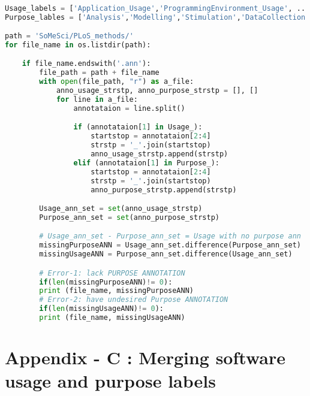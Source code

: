 \begin{lstlisting}[language=python,frame=tb,caption={Finding file names that have errors with software usage purpose labels in PLoS files},label=lst:useless]

Usage_labels = ['Application_Usage','ProgrammingEnvironment_Usage', ...] 
Purpose_lables = ['Analysis','Modelling','Stimulation','DataCollection', ...]

path = 'SoMeSci/PLoS_methods/'
for file_name in os.listdir(path):

	if file_name.endswith('.ann'):
		file_path = path + file_name
		with open(file_path, "r") as a_file:
			anno_usage_strstp, anno_purpose_strstp = [], []
			for line in a_file:
				annotataion = line.split()

				if (annotataion[1] in Usage_):
					startstop = annotataion[2:4]
					strstp = '_'.join(startstop)
					anno_usage_strstp.append(strstp)		
				elif (annotataion[1] in Purpose_):
					startstop = annotataion[2:4]
					strstp = '_'.join(startstop)
					anno_purpose_strstp.append(strstp)

		Usage_ann_set = set(anno_usage_strstp)
		Purpose_ann_set = set(anno_purpose_strstp)

		# Usage_ann_set - Purpose_ann_set = Usage with no purpose ann
		missingPurposeANN = Usage_ann_set.difference(Purpose_ann_set)
		missingUsageANN = Purpose_ann_set.difference(Usage_ann_set)

		# Error-1: lack PURPOSE ANNOTATION 
		if(len(missingPurposeANN)!= 0):
		print (file_name, missingPurposeANN) 
		# Error-2: have undesired Purpose ANNOTATION 
		if(len(missingUsageANN)!= 0):
		print (file_name, missingUsageANN)    


\end{lstlisting}



\chapter{Appendix - C : Merging software usage and purpose labels}
\label{ch:datasplit}

